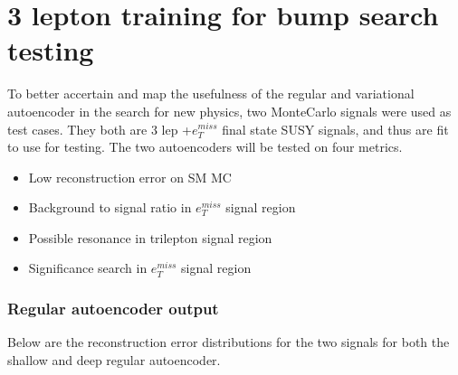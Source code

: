 
\section{3 lepton training for bump search testing}\label{sec:3lep}


To better accertain and map the usefulness of the regular and variational autoencoder in the search for 
new physics, two MonteCarlo signals were used as test cases. They both are 3 lep +$e_T^{miss}$ final state SUSY signals,
and thus are fit to use for testing. The two autoencoders will be tested on four metrics. 
\begin{itemize}
    \item Low reconstruction error on SM MC
    \item Background to signal ratio in $e_T^{miss}$ signal region
    \item Possible resonance in trilepton signal region
    \item Significance search in $e_T^{miss}$ signal region
\end{itemize}



\subsubsection*{Regular autoencoder output}

Below are the reconstruction error distributions for the two signals for both the shallow and deep 
regular autoencoder.

